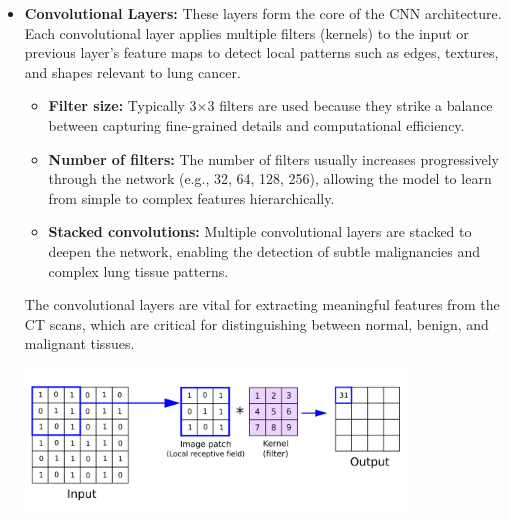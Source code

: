 \begin{itemize}
    \item \textbf{Convolutional Layers:} These layers form the core of the CNN architecture. Each 
    convolutional layer applies multiple filters (kernels) to the input or previous layer’s feature 
    maps to detect local patterns such as edges, textures, and shapes relevant to lung cancer.

        \begin{itemize}
            \item \textbf{Filter size:} Typically 3×3 filters are used because they strike a balance 
            between capturing fine-grained details and computational efficiency. \cite{sr2025}

            \item \textbf{Number of filters:} The number of filters usually increases progressively 
            through the network (e.g., 32, 64, 128, 256), allowing the model to learn from simple to 
            complex features hierarchically.

            \item \textbf{Stacked convolutions:} Multiple convolutional layers are stacked to deepen 
            the network, enabling the detection of subtle malignancies and complex lung tissue 
            patterns.
        \end{itemize}

    The convolutional layers are vital for extracting meaningful features from the CT scans, which 
    are critical for distinguishing between normal, benign, and malignant tissues.

    \vspace{1em}
    \begin{center} 
        \includegraphics[width = 0.8\textwidth]
        {../assets/03-model-architecture/convolutional-layer.png}


\end{center}
\end{itemize}
